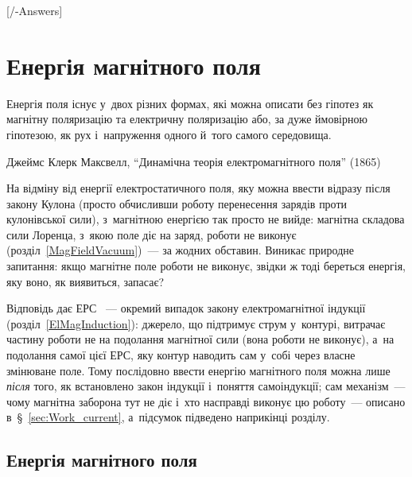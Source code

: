


[\currfilebase/\currfilebase-Answers]
\chapter{Енергія магнітного поля}\label{\currfilebase}\hypertarget{MagEnergy}{}
\graphicspath{{\currfilebase/Pictures}}
\epigraph{\Alexander Енергія поля існує у~двох різних формах, які можна описати без гіпотез як магнітну поляризацію та
електричну поляризацію або, за дуже ймовірною гіпотезою, як рух і~напруження одного й~того самого середовища.}{Джеймс Клерк
Максвелл, \enquote{Динамічна теорія електромагнітного поля} (1865)}

На відміну від енергії електростатичного поля, яку можна ввести відразу після закону
Кулона (просто обчисливши роботу перенесення зарядів проти кулонівської сили), з~магнітною
енергією так просто не вийде: магнітна складова сили Лоренца, з~якою поле діє на заряд,
роботи не виконує (розділ~\ref{MagFieldVacuum})~--- за жодних обставин. Виникає природне
запитання: якщо магнітне поле роботи не виконує, звідки ж тоді береться енергія, яку воно,
як виявиться, запасає?

Відповідь дає ЕРС ~--- окремий випадок закону електромагнітної
індукції (розділ~\ref{ElMagInduction}): джерело, що підтримує струм у~контурі, витрачає
частину роботи не на подолання магнітної сили (вона роботи не виконує), а~на подолання
самої цієї ЕРС, яку контур наводить сам у~собі через власне змінюване поле. Тому
послідовно ввести енергію магнітного поля можна лише \emph{після} того, як встановлено
закон індукції і~поняття самоіндукції; сам механізм~--- чому магнітна заборона тут не
діє і~хто насправді виконує цю роботу~--- описано в~\S~\ref{sec:Work_current}, а~підсумок підведено наприкінці розділу.

\section{Енергія магнітного поля}\hypertarget{magnetic-field-energy}{}



